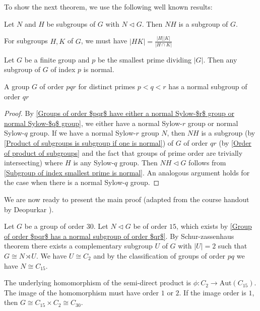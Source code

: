 To show the next theorem, we use the following well known results:
\begin{lemma}\label{Product of subgroups is subgroup if one is normal}
    Let $N$ and $H$ be subgroups of $G$ with $N \lhd G$. Then $NH$ is a subgroup of $G$.
\end{lemma}
\begin{lemma}\label{Order of product of subgroups}
    For subgroups $H, K$ of $G$, we must have $|HK| = \frac{|H||K|}{|H \cap K|}$
\end{lemma}
\begin{lemma}\label{Subgroup of index smallest prime is normal}
    Let $G$ be a finite group and $p$ be the smallest prime dividing $|G|$. Then any subgroup of $G$ of index $p$ is normal.
\end{lemma}

\begin{theorem}\label{Group of order $pqr$ has a normal subgroup of order $qr$}
    A group $G$ of order $pqr$ for distinct primes $p < q < r$ has a normal subgroup of order $qr$
\end{theorem}
\begin{proof}
    By \ref{Groups of order $pqr$ have either a normal Sylow-$r$ group or normal Sylow-$q$ group}, we either have a normal Sylow-$r$ group or normal Sylow-$q$ group. If we have a normal Sylow-$r$ group $N$, then $NH$ is a subgroup (by \ref{Product of subgroups is subgroup if one is normal}) of $G$ of order $qr$ (by \ref{Order of product of subgroups} and the fact that groups of prime order are trivially intersecting) where $H$ is any Sylow-$q$ group. Then $NH \lhd G$ follows from \ref{Subgroup of index smallest prime is normal}. An analogous argument holds for the case when there is a normal Sylow-$q$ group.
\end{proof}

We are now ready to present the main proof (adapted from the course handout by Deopurkar \cite{deopurkar_modern_2013}).

Let $G$ be a group of order $30$. Let $N \lhd G$ be of order $15$, which exists by \ref{Group of order $pqr$ has a normal subgroup of order $qr$}.
By Schur-zassenhaus theorem there exists a complementary subgroup $U$ of $G$ with $|U| = 2$ such that $G \cong N \rtimes U$. We have $U \cong C_2$ and by the classification of groups of order $pq$ we have $N \cong C_{15}$. 

The underlying homomorphism of the semi-direct product is $\phi : C_2 \rightarrow \text{Aut}(C_{15})$. The image of the homomorphism must have order $1$ or $2$. If the image order is $1$, then $G \cong C_{15} \times C_2 \cong C_{30}$. 

